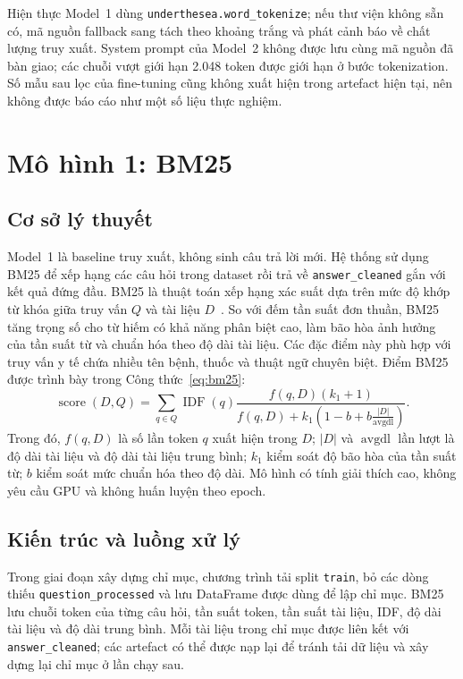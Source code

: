 \documentclass[12pt,a4paper,oneside]{report}
\begin{document}
Hiện thực Model~1 dùng \texttt{underthesea.word\_tokenize}; nếu thư viện không sẵn có, mã nguồn fallback sang tách theo khoảng trắng và phát cảnh báo về chất lượng truy xuất. System prompt của Model~2 không được lưu cùng mã nguồn đã bàn giao; các chuỗi vượt giới hạn 2.048 token được giới hạn ở bước tokenization. Số mẫu sau lọc của fine-tuning cũng không xuất hiện trong artefact hiện tại, nên không được báo cáo như một số liệu thực nghiệm.

\section{Mô hình 1: BM25}
\subsection{Cơ sở lý thuyết}
Model~1 là baseline truy xuất, không sinh câu trả lời mới. Hệ thống sử dụng BM25 để xếp hạng các câu hỏi trong dataset rồi trả về \texttt{answer\_cleaned} gắn với kết quả đứng đầu. BM25 là thuật toán xếp hạng xác suất dựa trên mức độ khớp từ khóa giữa truy vấn $Q$ và tài liệu $D$~\cite{robertson2009bm25}. So với đếm tần suất đơn thuần, BM25 tăng trọng số cho từ hiếm có khả năng phân biệt cao, làm bão hòa ảnh hưởng của tần suất từ và chuẩn hóa theo độ dài tài liệu. Các đặc điểm này phù hợp với truy vấn y tế chứa nhiều tên bệnh, thuốc và thuật ngữ chuyên biệt. Điểm BM25 được trình bày trong Công thức~\ref{eq:bm25}:
\begin{equation}
\operatorname{score}(D,Q)=\sum_{q\in Q}\operatorname{IDF}(q)
\frac{f(q,D)(k_1+1)}{f(q,D)+k_1\left(1-b+b\frac{|D|}{\operatorname{avgdl}}\right)}.
\label{eq:bm25}
\end{equation}
Trong đó, $f(q,D)$ là số lần token $q$ xuất hiện trong $D$; $|D|$ và $\operatorname{avgdl}$ lần lượt là độ dài tài liệu và độ dài tài liệu trung bình; $k_1$ kiểm soát độ bão hòa của tần suất từ; $b$ kiểm soát mức chuẩn hóa theo độ dài. Mô hình có tính giải thích cao, không yêu cầu GPU và không huấn luyện theo epoch.

\subsection{Kiến trúc và luồng xử lý}
Trong giai đoạn xây dựng chỉ mục, chương trình tải split \texttt{train}, bỏ các dòng thiếu \texttt{question\_processed} và lưu DataFrame được dùng để lập chỉ mục. BM25 lưu chuỗi token của từng câu hỏi, tần suất token, tần suất tài liệu, IDF, độ dài tài liệu và độ dài trung bình. Mỗi tài liệu trong chỉ mục được liên kết với \texttt{answer\_cleaned}; các artefact có thể được nạp lại để tránh tải dữ liệu và xây dựng lại chỉ mục ở lần chạy sau.
\end{document}
